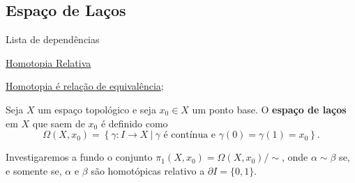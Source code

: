 \subsection{Espaço de Laços}
\label{espaco-lacos-def}
\begin{titlemize}{Lista de dependências}
    \item \hyperref[homotopia-relativa-def]{Homotopia Relativa}
	\item \hyperref[homotopia-relaçao-de-equivalencia-prop]{Homotopia é relação de equivalência};\\
\end{titlemize}
\begin{defi}
	Seja $X$ um espaço topológico e seja $x_0\in X$ um ponto base. O \textbf{espaço de laços} em $X$ que saem de $x_0$ é definido como
\[\Omega(X,x_0) = \left\{\gamma: I \to X ~|~ \gamma\text{ é contínua e }\gamma(0)=\gamma(1)=x_0\right\}.\]
\end{defi}

Investigaremos a fundo o conjunto $\pi_1(X,x_0) = \Omega(X,x_0)/\sim$, onde $\alpha \sim \beta$ se, e somente se, $\alpha$ e $\beta$ são homotópicas relativo a $\partial I = \{0,1\}$.


